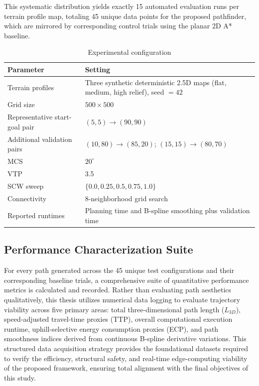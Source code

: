 This systematic distribution yields exactly 15 automated evaluation runs per terrain profile map,
totaling 45 unique data points for the proposed pathfinder, which are mirrored by corresponding
control trials using the planar 2D A* baseline.

\begin{table}[htbp]
\caption{Experimental configuration}
\label{tab:experiment_setup}
\centering
\footnotesize
\begin{tabular}{p{} p{}}
\toprule
\textbf{Parameter} & \textbf{Setting} \\
\midrule
Terrain profiles & Three synthetic deterministic 2.5D maps (flat, medium, high relief), seed $=42$ \\
Grid size & $500\times 500$ \\
Representative start-goal pair & $(5,5)\rightarrow(90,90)$ \\
Additional validation pairs & $(10,80)\rightarrow(85,20)$; $(15,15)\rightarrow(80,70)$ \\
MCS & $20^\circ$ \\
VTP & 3.5 \\
SCW sweep & $\{0.0, \allowbreak 0.25, \allowbreak 0.5, \allowbreak 0.75, \allowbreak 1.0\}$ \\
Connectivity & 8-neighborhood grid search \\
Reported runtimes & Planning time and B-spline smoothing plus validation time \\
\bottomrule
\end{tabular}
\end{table}

\subsection{Performance Characterization Suite}

For every path generated across the 45 unique test configurations and their corresponding baseline
trials, a comprehensive suite of quantitative performance metrics is calculated and recorded. Rather
than evaluating path aesthetics qualitatively, this thesis utilizes numerical data logging to
evaluate trajectory viability across five primary areas: total three-dimensional path length
($L_{3D}$), speed-adjusted travel-time proxies (TTP), overall computational execution runtime,
uphill-selective energy consumption proxies (ECP), and path smoothness indices derived from
continuous B-spline derivative variations. This structured data acquisition strategy provides the
foundational datasets required to verify the efficiency, structural safety, and real-time
edge-computing viability of the proposed framework, ensuring total alignment with the final
objectives of this study.

